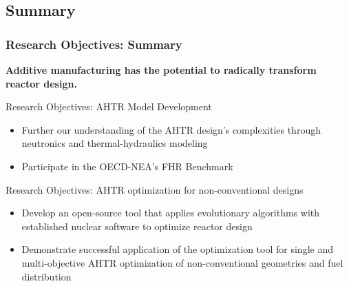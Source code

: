 \subsection{Summary}
\begin{frame}
    \frametitle{Research Objectives: Summary}
    \textbf{Additive manufacturing has the potential to radically transform reactor design.}
    \begin{block}{Research Objectives: AHTR Model Development}
        \begin{itemize}
            \item Further our understanding of the AHTR design's complexities 
            through neutronics and thermal-hydraulics modeling
            \item Participate in the OECD-NEA's FHR Benchmark
        \end{itemize}
    \end{block}

    \begin{block}{Research Objectives: AHTR optimization for non-conventional designs}
        \begin{itemize}
            \item Develop an open-source tool that applies evolutionary algorithms with established 
            nuclear software to optimize reactor design
            \item Demonstrate successful application of the optimization tool 
            for single and multi-objective AHTR optimization of 
            non-conventional geometries and fuel distribution
        \end{itemize}
    \end{block}
\end{frame}